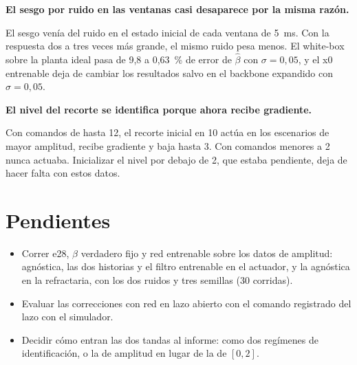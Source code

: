 \documentclass[10pt,a4paper]{article}
\newcommand{\bh}{\hat\beta}
\newcommand{\hip}[1]{\par\smallskip\textbf{#1}\par}
\begin{document}
\hip{El sesgo por ruido en las ventanas casi desaparece por la misma razón.}
El sesgo venía del ruido en el estado inicial de cada ventana de 5~ms. Con la respuesta dos a tres veces más grande, el mismo ruido pesa menos. El white-box sobre la planta ideal pasa de 9,8 a 0,63~\% de error de $\bh$ con $\sigma = 0{,}05$, y el x0 entrenable deja de cambiar los resultados salvo en el backbone expandido con $\sigma = 0{,}05$.

\hip{El nivel del recorte se identifica porque ahora recibe gradiente.}
Con comandos de hasta 12, el recorte inicial en 10 actúa en los escenarios de mayor amplitud, recibe gradiente y baja hasta 3. Con comandos menores a 2 nunca actuaba. Inicializar el nivel por debajo de 2, que estaba pendiente, deja de hacer falta con estos datos.

\section{Pendientes}

\begin{itemize}[leftmargin=*,itemsep=0.3em]
\item Correr e28, $\beta$ verdadero fijo y red entrenable sobre los datos de amplitud: agnóstica, las dos historias y el filtro entrenable en el actuador, y la agnóstica en la refractaria, con los dos ruidos y tres semillas (30 corridas).
\item Evaluar las correcciones con red en lazo abierto con el comando registrado del lazo con el simulador.
\item Decidir cómo entran las dos tandas al informe: como dos regímenes de identificación, o la de amplitud en lugar de la de $[0, 2]$.
\end{itemize}
\end{document}
